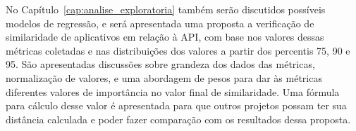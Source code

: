 No Capítulo~\ref{cap:analise_exploratoria} também serão discutidos possíveis modelos de regressão, e será apresentada uma proposta a verificação de similaridade de aplicativos em relação à API, com base nos valores dessas métricas coletadas e nas distribuições dos valores a partir dos percentis 75, 90 e 95. São apresentadas discussões sobre grandeza dos dados das métricas, normalização de valores, e uma abordagem de pesos para dar às métricas diferentes valores de importância no valor final de similaridade. Uma fórmula para cálculo desse valor é apresentada para que outros projetos possam ter sua distância calculada e poder fazer comparação com os resultados dessa proposta.
